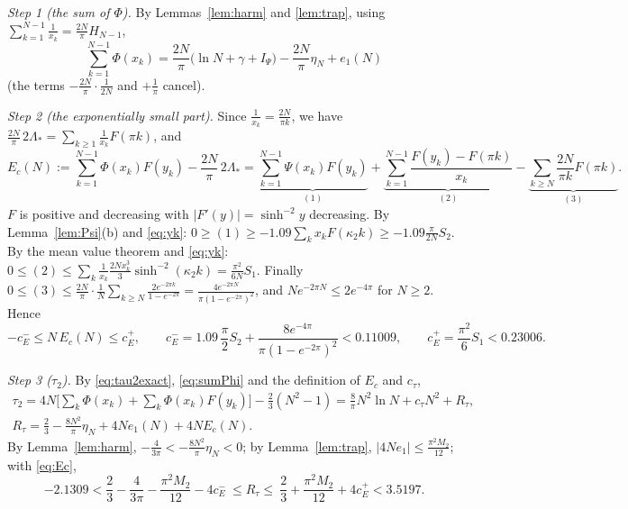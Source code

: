 \documentclass[11pt,a4paper]{article}
\theoremstyle{plain}
\theoremstyle{definition}
\numberwithin{equation}{section}
\begin{document}
\emph{Step 1 (the sum of $\Phi$).} By Lemmas~\ref{lem:harm} and \ref{lem:trap}, using $\sum_{k=1}^{N-1}\frac1{x_k}=\frac{2N}\pi H_{N-1}$,
\begin{equation}\label{eq:sumPhi}
\sum_{k=1}^{N-1}\Phi(x_k)=\frac{2N}{\pi}\big(\ln N+\gamma+I_\Psi\big)-\frac{2N}{\pi}\eta_N+e_1(N)
\end{equation}
(the terms $-\frac{2N}{\pi}\cdot\frac{1}{2N}$ and $+\frac1\pi$ cancel).

\emph{Step 2 (the exponentially small part).} Since $\frac{1}{x_k}=\frac{2N}{\pi k}$, we have $\frac{2N}\pi\,2\Lambda_*=\sum_{k\ge1}\frac1{x_k}F(\pi k)$, and
\[
E_c(N):=\sum_{k=1}^{N-1}\Phi(x_k)F(y_k)-\frac{2N}{\pi}\,2\Lambda_*=\underbrace{\sum_{k=1}^{N-1}\Psi(x_k)F(y_k)}_{(1)}+\underbrace{\sum_{k=1}^{N-1}\frac{F(y_k)-F(\pi k)}{x_k}}_{(2)}-\underbrace{\sum_{k\ge N}\frac{2N}{\pi k}F(\pi k)}_{(3)}.
\]
$F$ is positive and decreasing with $|F'(y)|=\sinh^{-2}y$ decreasing. By Lemma~\ref{lem:Psi}(b) and \eqref{eq:yk}: $0\ge(1)\ge-1.09\sum_kx_kF(\kappa_2k)\ge-1.09\frac{\pi}{2N}S_2$. By the mean value theorem and \eqref{eq:yk}: $0\le(2)\le\sum_k\frac1{x_k}\frac{2Nx_k^3}{3}\sinh^{-2}(\kappa_2k)=\frac{\pi^2}{6N}S_1$. Finally $0\le(3)\le\frac{2N}{\pi}\cdot\frac1N\sum_{k\ge N}\frac{2e^{-2\pi k}}{1-e^{-2\pi}}=\frac{4e^{-2\pi N}}{\pi(1-e^{-2\pi})^2}$, and $Ne^{-2\pi N}\le2e^{-4\pi}$ for $N\ge2$. Hence
\begin{equation}\label{eq:Ec}
-c_E^-\le N\,E_c(N)\le c_E^+,\qquad c_E^-=1.09\,\frac\pi2S_2+\frac{8e^{-4\pi}}{\pi(1-e^{-2\pi})^2}<0.11009,\qquad c_E^+=\frac{\pi^2}6S_1<0.23006 .
\end{equation}

\emph{Step 3 ($\tau_2$).} By \eqref{eq:tau2exact}, \eqref{eq:sumPhi} and the definition of $E_c$ and $c_\tau$,
\[
\begin{gathered}\tau_2=4N\Big[\sum_k\Phi(x_k)+\sum_k\Phi(x_k)F(y_k)\Big]-\frac23(N^2-1)=\frac8\pi N^2\ln N+c_\tau N^2+R_\tau,\\
R_\tau=\frac23-\frac{8N^2}{\pi}\eta_N+4Ne_1(N)+4NE_c(N).\end{gathered}
\]
By Lemma~\ref{lem:harm}, $-\frac{4}{3\pi}<-\frac{8N^2}\pi\eta_N<0$; by Lemma~\ref{lem:trap}, $|4Ne_1|\le\frac{\pi^2M_2}{12}$; with \eqref{eq:Ec},
\[
-2.1309<\frac23-\frac4{3\pi}-\frac{\pi^2M_2}{12}-4c_E^-\ \le R_\tau\le\ \frac23+\frac{\pi^2M_2}{12}+4c_E^+<3.5197 .
\]
\end{document}
